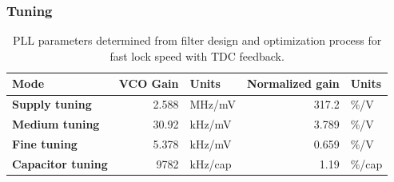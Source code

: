 	\subsubsection{Tuning}
		\begin{table}[h!]
			\centering
			\def\arraystretch{1.5}		
			\setlength\arrayrulewidth{0.75pt}
			\setlength{\tabcolsep}{1em} %
			\begin{tabular}{|l|r|l|r|l|}
				\hline 
				\rule[-1ex]{0pt}{2.5ex} \cellcolor{gray!40}\textbf{Mode} & \cellcolor{gray!40}\textbf{VCO Gain} & \cellcolor{gray!40}\textbf{Units} & \cellcolor{gray!40}\textbf{Normalized gain}& \cellcolor{gray!40}\textbf{Units}\\ 
				\hline 
				\rule[-1ex]{0pt}{2.5ex} \textbf{Supply tuning}  & 2.588 & MHz/mV & 317.2 &\%/V\\
				\hline 
				\rule[-1ex]{0pt}{2.5ex} \textbf{Medium tuning}  & 30.92 & kHz/mV  & 3.789 &\%/V\\
				\hline 
				\rule[-1ex]{0pt}{2.5ex} \textbf{Fine tuning}  & 5.378 & kHz/mV & 0.659 & \%/V\\
				\hline 
				\rule[-1ex]{0pt}{2.5ex} \textbf{Capacitor tuning} & 9782 & kHz/cap & 1.19 & \%/cap\\
				\hline 
			\end{tabular} 
			\caption{PLL parameters determined from filter design and optimization process for fast lock speed with TDC feedback.}
			\label{tab:vco_gains}
		\end{table} 

